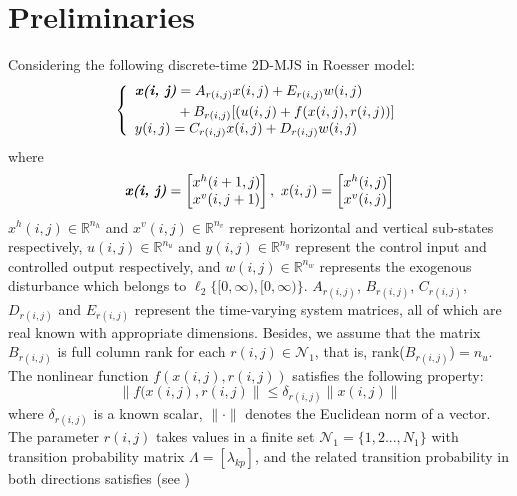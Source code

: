 \documentclass[journal,final,twocolumn]{IEEEtran}
\begin{document}
\section{Preliminaries} \label{priliminaries}
	Considering the following discrete-time 2D-MJS in Roesser model:
	\begin{equation} \label{system-equation}
	\left\{
		\begin{array}{lr}
			\begin{split}
				\emph{\textbf{x(i, j)}} &= A_{r(i,j)}x(i,j)+E_{r(i,j)}w(i,j)\\
										&+B_{r(i,j)}[(u(i,j)+f(x(i,j),r(i,j))]
			\end{split}\\
			\begin{split}
				y(i,j) = C_{r(i,j)}x(i,j)+D_{r(i,j)}w(i,j)
			\end{split}
		\end{array}
	\right.
	\end{equation}
	where
	\begin{equation*}
		\emph{\textbf{x(i, j)}} = \begin{bmatrix}
			x^{h}(i+1,j)\\
			x^{v}(i,j+1)
		\end{bmatrix}, \ 
		x(i, j) = \begin{bmatrix}
		x^{h}(i,j)\\
		x^{v}(i,j)
		\end{bmatrix}          
	\end{equation*}
	$x^{h}(i,j)\in \mathbb{R}^{n_h}$ and $x^{v}(i,j)\in \mathbb{R}^{n_v}$ represent horizontal and vertical sub-states respectively, $u(i,j) \in \mathbb{R}^{n_u}$ and $y(i,j) \in \mathbb{R}^{n_y}$ represent the control input and controlled output respectively, and $w(i,j) \in \mathbb{R}^{n_w}$ represents the exogenous disturbance which belongs to $\ell_{2}\{[0,\infty),[0,\infty)\}$. $A_{r(i,j)}$, $B_{r(i,j)}$, $C_{r(i,j)}$, $D_{r(i,j)}$ and $E_{r(i,j)}$ represent the time-varying system matrices, all of which are real known with appropriate dimensions. Besides, we assume that the matrix $B_{r(i,j)}$ is full column rank for each $r(i,j)\in\mathcal{N}_{1}$, that is, rank($B_{r(i,j)}$)$=n_u$. The nonlinear function $f(x(i,j),r(i,j))$ satisfies the following property:
	\begin{equation}\label{nonlinear-func}
		\|f(x(i,j),r(i,j)\| \leq \delta_{r(i,j)}\|x(i,j)\|
	\end{equation}
	where $\delta_{r(i,j)}$ is a known scalar, $\|\cdot\|$ denotes the Euclidean norm of a vector. The parameter $r(i,j)$ takes values in a finite set $\mathcal{N}_{1}=\{1,2...,N_{1} \}$ with transition probability matrix $\varLambda = [\lambda_{kp}]$, and the related transition probability in both directions satisfies (see \cite{wu2018hcontrol2d,wu2008hfiltering2d})
\end{document}

